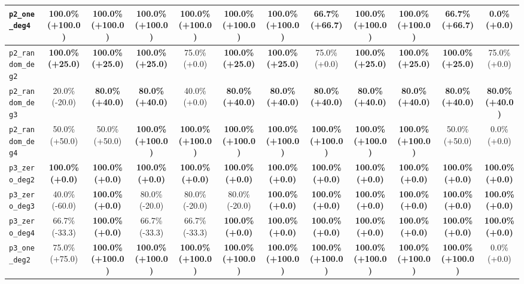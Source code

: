 \begin{landscape}
\begin{table}[H]
{\begin{tabular}{lccccccccccc}
\hline
\texttt{p2\_one\_deg4} & \textbf{100.0\% (+100.0)} & \textbf{100.0\% (+100.0)} & \textbf{100.0\% (+100.0)} & \textbf{100.0\% (+100.0)} & \textbf{100.0\% (+100.0)} & \textbf{100.0\% (+100.0)} & 66.7\% (+66.7) & \textbf{100.0\% (+100.0)} & \textbf{100.0\% (+100.0)} & 66.7\% (+66.7) & 0.0\% (+0.0) \\
\hline
\texttt{p2\_random\_deg2} & \textbf{100.0\% (+25.0)} & \textbf{100.0\% (+25.0)} & \textbf{100.0\% (+25.0)} & 75.0\% (+0.0) & \textbf{100.0\% (+25.0)} & \textbf{100.0\% (+25.0)} & 75.0\% (+0.0) & \textbf{100.0\% (+25.0)} & \textbf{100.0\% (+25.0)} & \textbf{100.0\% (+25.0)} & 75.0\% (+0.0) \\
\hline
\texttt{p2\_random\_deg3} & 20.0\% (-20.0) & \textbf{80.0\% (+40.0)} & \textbf{80.0\% (+40.0)} & 40.0\% (+0.0) & \textbf{80.0\% (+40.0)} & \textbf{80.0\% (+40.0)} & \textbf{80.0\% (+40.0)} & \textbf{80.0\% (+40.0)} & \textbf{80.0\% (+40.0)} & \textbf{80.0\% (+40.0)} & \textbf{80.0\% (+40.0)} \\
\hline
\texttt{p2\_random\_deg4} & 50.0\% (+50.0) & 50.0\% (+50.0) & \textbf{100.0\% (+100.0)} & \textbf{100.0\% (+100.0)} & \textbf{100.0\% (+100.0)} & \textbf{100.0\% (+100.0)} & \textbf{100.0\% (+100.0)} & \textbf{100.0\% (+100.0)} & \textbf{100.0\% (+100.0)} & 50.0\% (+50.0) & 0.0\% (+0.0) \\
\hline
\texttt{p3\_zero\_deg2} & \textbf{100.0\% (+0.0)} & \textbf{100.0\% (+0.0)} & \textbf{100.0\% (+0.0)} & \textbf{100.0\% (+0.0)} & \textbf{100.0\% (+0.0)} & \textbf{100.0\% (+0.0)} & \textbf{100.0\% (+0.0)} & \textbf{100.0\% (+0.0)} & \textbf{100.0\% (+0.0)} & \textbf{100.0\% (+0.0)} & \textbf{100.0\% (+0.0)} \\
\hline
\texttt{p3\_zero\_deg3} & 40.0\% (-60.0) & \textbf{100.0\% (+0.0)} & 80.0\% (-20.0) & 80.0\% (-20.0) & 80.0\% (-20.0) & \textbf{100.0\% (+0.0)} & \textbf{100.0\% (+0.0)} & \textbf{100.0\% (+0.0)} & \textbf{100.0\% (+0.0)} & \textbf{100.0\% (+0.0)} & \textbf{100.0\% (+0.0)} \\
\hline
\texttt{p3\_zero\_deg4} & 66.7\% (-33.3) & \textbf{100.0\% (+0.0)} & 66.7\% (-33.3) & 66.7\% (-33.3) & \textbf{100.0\% (+0.0)} & \textbf{100.0\% (+0.0)} & \textbf{100.0\% (+0.0)} & \textbf{100.0\% (+0.0)} & \textbf{100.0\% (+0.0)} & \textbf{100.0\% (+0.0)} & \textbf{100.0\% (+0.0)} \\
\hline
\texttt{p3\_one\_deg2} & 75.0\% (+75.0) & \textbf{100.0\% (+100.0)} & \textbf{100.0\% (+100.0)} & \textbf{100.0\% (+100.0)} & \textbf{100.0\% (+100.0)} & \textbf{100.0\% (+100.0)} & \textbf{100.0\% (+100.0)} & \textbf{100.0\% (+100.0)} & \textbf{100.0\% (+100.0)} & \textbf{100.0\% (+100.0)} & 0.0\% (+0.0) \\

\end{tabular}}
\end{table}
\end{landscape}
